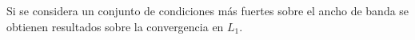 \begin{itemize}

Si se considera un conjunto de condiciones más fuertes sobre el ancho de banda se obtienen resultados sobre la convergencia en $L_1$. 




\end{itemize}
